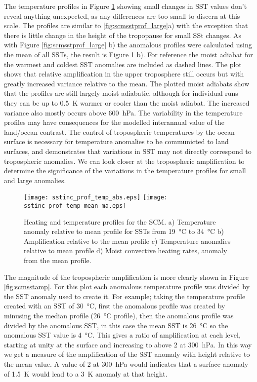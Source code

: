 The temperature profiles in Figure \ref{fig:scmsstinc_prof} showing small 
changes in SST values don't reveal anything unexpected, as any differences are 
too small to discern at this scale. The profiles are similar to 
\ref{fig:scmsstprof_large}a) with the exception that there is little change in 
the height of the tropopause for small SSt changes. As with Figure 
\ref{fig:scmsstprof_large} b) the anomalous profiles were calculated using the 
mean of all SSTs, the result is Figure \ref{fig:scmsstinc_prof} b). For 
reference the moist adiabat for the warmest and coldest SST anomalies are 
included as dashed lines. The plot shows that relative amplification in the 
upper troposphere still occurs but with greatly increased variance relative to 
the mean. The plotted moist adiabats show that the profiles are still largely 
moist adiabatic, although for individual runs they can be up to 
\SI{0.5}{\kelvin} warmer or cooler than the moist adiabat. The increased 
variance also mostly occurs above \SI{600}{\hecto\pascal}. The variability in 
the temperature profiles may have consequences for the modelled interannual 
value of the land/ocean contrast. The control of tropospheric temperatures by 
the ocean surface is necessary for temperature anomalies to be communicted to 
land surfaces, and demonstrates that variations in SST may not directly 
correspond to tropospheric anomalies. We can look closer at the tropospheric 
amplification to determine the significance of the variations in the temperature 
profiles for small and large anomalies.


\begin{figure}[ht]
\texttt{[image: sstinc\_prof\_temp\_abs.eps]}
\texttt{[image: sstinc\_prof\_temp\_mean\_ma.eps]}
\caption{Heating and temperature profiles for the SCM. a) Temperature anomaly 
	relative to mean profile for SSTs from \SI{19}{\degreeCelsius} to 
	\SI{34}{\degreeCelsius} b) Amplification relative to the mean profile c) 
	Temperature anomalies relative to mean profile d) Moist convective heating 
rates, anomaly from the mean profile.}
\label{fig:scmsstinc_prof}
\end{figure}

The magnitude of the tropospheric amplification is more clearly shown in Figure 
\ref{fig:scmsstamp}. For this plot each anomalous temperature profile was 
divided by the SST anomaly used to create it. For example; taking the 
temperature profile created with an SST of \SI{30}{\degreeCelsius}, first the 
anomalous profile was created by minusing the median profile 
(\SI{26}{\degreeCelsius} profile), then the anomalous profile was divided by the 
anomalous SST, in this case the mean SST is \SI{26}{\celsius} so the anomalous 
SST value is \SI{4}{\celsius}.  This gives a ratio of amplification at each 
level, starting at unity at the surface and increasing to above 2 at 
\SI{300}{\hecto\pascal}.  In this way we get a measure of the amplification of 
the SST anomaly with height relative to the mean value.  A value of 2 at 
\SI{300}{\hecto\pascal} would indicates that a surface anomaly of 
\SI{1.5}{\kelvin} would lead to a \SI{3}{\kelvin} anomaly at that height.  

